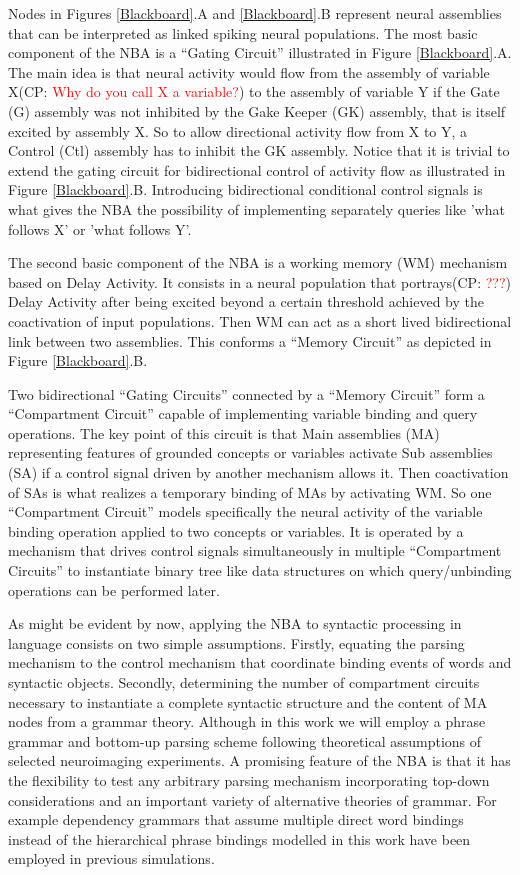 \documentclass[10pt]{article}
\newcommand{\noteCP}[1]{(CP: \textcolor{red}{#1})}
\begin{document}
Nodes in Figures {\ref{Blackboard}}.A and {\ref{Blackboard}}.B represent neural assemblies that can be interpreted as linked spiking neural populations.
The most basic component of the NBA is a ``Gating Circuit'' illustrated in Figure {\ref{Blackboard}}.A.
The main idea is that neural activity would flow from the assembly of variable X\noteCP{Why do you call X a variable?} to the assembly of variable Y if the Gate (G) assembly was not inhibited by the Gake Keeper (GK) assembly, that is itself excited by assembly X.
So to allow directional activity flow from X to Y, a Control (Ctl) assembly has to inhibit the GK assembly.
Notice that it is trivial to extend the gating circuit for bidirectional control of activity flow as illustrated in Figure {\ref{Blackboard}}.B.
Introducing bidirectional conditional control signals is what gives the NBA the possibility of implementing separately queries like 'what follows X' or 'what follows Y'.

The second basic component of the NBA is a working memory (WM) mechanism based on Delay Activity\cite{de_Kamps_2005}.
It consists in a neural population that portrays\noteCP{???} Delay Activity after being excited beyond a certain threshold achieved by the coactivation of input populations.
Then WM can act as a short lived bidirectional link between two assemblies. This conforms a ``Memory Circuit'' as depicted in Figure {\ref{Blackboard}}.B.

Two bidirectional ``Gating Circuits'' connected by a ``Memory Circuit'' form a ``Compartment Circuit'' capable of implementing variable binding and query operations.
The key point of this circuit is that Main assemblies (MA) representing features of grounded concepts or variables activate Sub assemblies (SA) if a control signal driven by another mechanism allows it.
Then coactivation of SAs is what realizes a temporary binding of MAs by activating WM.
So one ``Compartment Circuit'' models specifically the neural activity of the variable binding operation applied to two concepts or variables.
It is operated by a mechanism that drives control signals simultaneously in multiple ``Compartment Circuits'' to instantiate binary tree like data structures on which query/unbinding operations can be performed later. 

As might be evident by now, applying the NBA to syntactic processing in language consists on two simple assumptions.
Firstly, equating the parsing mechanism to the control mechanism that coordinate binding events of words and syntactic objects.
Secondly, determining the number of compartment circuits necessary to instantiate a complete syntactic structure and the content of MA nodes from a grammar theory.
Although in this work we will employ a phrase grammar and bottom-up parsing scheme following theoretical assumptions of selected neuroimaging experiments.
A promising feature of the NBA is that it has the flexibility to test any arbitrary parsing mechanism incorporating top-down considerations and an important variety of alternative theories of grammar.
For example dependency grammars that assume multiple direct word bindings instead of the hierarchical phrase bindings modelled in this work have been employed in previous simulations\cite{van_der_Velde_2010}.
\end{document}
